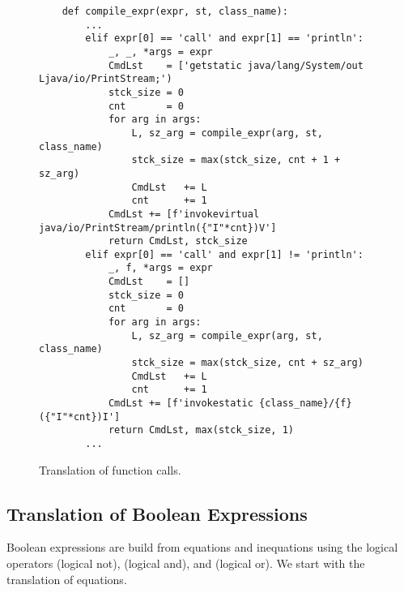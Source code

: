 \begin{figure}[!ht]
\centering
\begin{verbatim}
    def compile_expr(expr, st, class_name):
        ...
        elif expr[0] == 'call' and expr[1] == 'println':
            _, _, *args = expr
            CmdLst    = ['getstatic java/lang/System/out Ljava/io/PrintStream;')
            stck_size = 0
            cnt       = 0
            for arg in args:
                L, sz_arg = compile_expr(arg, st, class_name)
                stck_size = max(stck_size, cnt + 1 + sz_arg)
                CmdLst   += L
                cnt      += 1
            CmdLst += [f'invokevirtual java/io/PrintStream/println({"I"*cnt})V']
            return CmdLst, stck_size
        elif expr[0] == 'call' and expr[1] != 'println':
            _, f, *args = expr
            CmdLst    = []
            stck_size = 0
            cnt       = 0
            for arg in args:
                L, sz_arg = compile_expr(arg, st, class_name)
                stck_size = max(stck_size, cnt + sz_arg)
                CmdLst   += L
                cnt      += 1
            CmdLst += [f'invokestatic {class_name}/{f}({"I"*cnt})I']
            return CmdLst, max(stck_size, 1)
        ...
\end{verbatim}
\vspace*{-0.3cm}
\caption{Translation of function calls.}
\label{fig:Compiler.ipynb:compile:call}
\end{figure}

\subsection{Translation of Boolean Expressions}
Boolean expressions are build from equations and inequations using the logical operators
\qote{!} (logical not), \qote{\&\&} (logical and), and \qote{||} (logical or).
We start with the translation of equations.

